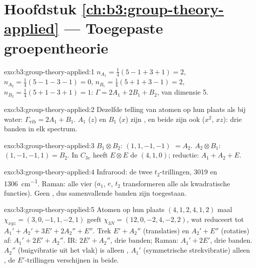 \section*{Hoofdstuk \ref{ch:b3:group-theory-applied} --- Toegepaste groepentheorie}

\begin{solution}{exo:b3:group-theory-applied:1}
$n_{A_1} = \frac14(5 - 1 + 3 + 1) = 2$, $n_{A_2} = \frac14(5 - 1 - 3 - 1) = 0$,
$n_{B_1} = \frac14(5 + 1 + 3 - 1) = 2$, $n_{B_2} = \frac14(5 + 1 - 3 + 1) = 1$:
$\Gamma = 2A_1 + 2B_1 + B_2$, van dimensie 5.
\end{solution}

\begin{solution}{exo:b3:group-theory-applied:2}
Dezelfde telling van atomen op hun plaats als bij water: $\Gamma_{\mathrm{vib}} = 2A_1 + B_1$. $A_1$ ($z$) en
$B_1$ ($x$) zijn , en beide zijn ook  ($x^2$, $xz$):
drie banden in elk spectrum.
\end{solution}

\begin{solution}{exo:b3:group-theory-applied:3}
$B_1\otimes B_2$:  $(1, 1, -1, -1)$ $= A_2$. $A_2\otimes B_1$: $(1, -1, -1,
1) = B_2$. In $C_{3v}$ heeft $E\otimes E$ de  $(4, 1, 0)$; reductie:
$A_1 + A_2 +
E$.
\end{solution}

\begin{solution}{exo:b3:group-theory-applied:4}
Infrarood: de twee $t_2$-trillingen, 3019 en \qty{1306}{cm^{-1}}. Raman: alle
vier ($a_1$,
$e$, $t_2$ transformeren alle als kwadratische functies). Geen
, dus samenvallende banden zijn toegestaan.
\end{solution}

\begin{solution}{exo:b3:group-theory-applied:5}
Atomen op hun plaats $(4, 1, 2, 4, 1, 2)$ maal $\chi_{xyz} = (3, 0, -1, 1, -2, 1)$ geeft
$\chi_{3N} = (12, 0, -2, 4, -2, 2)$, wat reduceert tot $A_1' + A_2' + 3E' + 2A_2'' +
E''$. Trek $E' + A_2''$ (translaties) en $A_2' + E''$ (rotaties) af: $A_1' + 2E'
+ A_2''$. IR: $2E' + A_2''$, drie banden; Raman: $A_1' + 2E'$, drie banden. $A_2''$
(buigvibratie uit het vlak) is alleen , $A_1'$ (symmetrische
strekvibratie) alleen , de $E'$-trillingen verschijnen in beide.
\end{solution}

